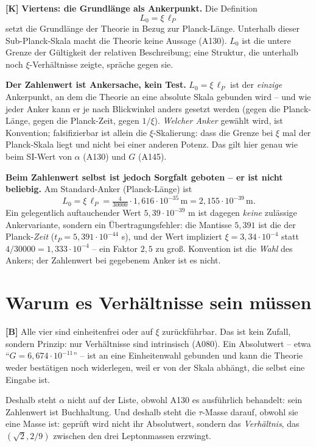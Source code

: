\textbf{[K]} \textbf{Viertens: die Grundlänge als Ankerpunkt.} Die Definition
\[
  L_0 = \xi\,\ell_P
\]
setzt die Grundlänge der Theorie in Bezug zur Planck-Länge. Unterhalb dieser
Sub-Planck-Skala macht die Theorie keine Aussage (A130). $L_0$ ist die untere
Grenze der Gültigkeit der relativen Beschreibung; eine Struktur, die unterhalb
noch $\xi$-Verhältnisse zeigte, spräche gegen sie.

\textbf{Der Zahlenwert ist Ankersache, kein Test.} $L_0 = \xi\,\ell_P$ ist der
\emph{einzige} Ankerpunkt, an dem die Theorie an eine absolute Skala gebunden
wird -- und wie jeder Anker kann er je nach Blickwinkel anders gesetzt werden
(gegen die Planck-Länge, gegen die Planck-Zeit, gegen $1/\xi$). \emph{Welcher
Anker} gewählt wird, ist Konvention; falsifizierbar ist allein die
$\xi$-Skalierung: dass die Grenze bei $\xi$ mal der Planck-Skala liegt und nicht
bei einer anderen Potenz. Das gilt hier genau wie beim SI-Wert von $\alpha$
(A130) und $G$ (A145).

\textbf{Beim Zahlenwert selbst ist jedoch Sorgfalt geboten -- er ist nicht
beliebig.} Am Standard-Anker (Planck-Länge) ist
\[
  L_0 = \xi\,\ell_P = \tfrac{4}{30000}\cdot 1{,}616\cdot10^{-35}\,\text{m}
       = 2{,}155\cdot10^{-39}\,\text{m}.
\]
Ein gelegentlich auftauchender Wert $5{,}39\cdot10^{-39}$ m ist dagegen
\emph{keine} zulässige Ankervariante, sondern ein Übertragungsfehler: die
Mantisse $5{,}391$ ist die der Planck-\emph{Zeit}
($t_P = 5{,}391\cdot10^{-44}$ s), und der Wert impliziert
$\xi = 3{,}34\cdot10^{-4}$ statt $4/30000 = 1{,}333\cdot10^{-4}$ -- ein Faktor
$2{,}5$ zu groß. Konvention ist die \emph{Wahl} des Ankers; der Zahlenwert bei
gegebenem Anker ist es nicht.

\section{Warum es Verhältnisse sein müssen}

\textbf{[B]} Alle vier sind einheitenfrei oder auf $\xi$ zurückführbar. Das ist
kein Zufall, sondern Prinzip: nur Verhältnisse sind intrinsisch (A080). Ein
Absolutwert -- etwa \enquote{$G = 6{,}674\cdot10^{-11}$} -- ist an eine
Einheitenwahl gebunden und kann die Theorie weder bestätigen noch widerlegen,
weil er von der Skala abhängt, die selbst eine Eingabe ist.

Deshalb steht $\alpha$ nicht auf der Liste, obwohl A130 es ausführlich behandelt:
sein Zahlenwert ist Buchhaltung. Und deshalb steht die $\tau$-Masse darauf,
obwohl sie eine Masse ist: geprüft wird nicht ihr Absolutwert, sondern das
\emph{Verhältnis}, das $(\sqrt2, 2/9)$ zwischen den drei Leptonmassen erzwingt.

